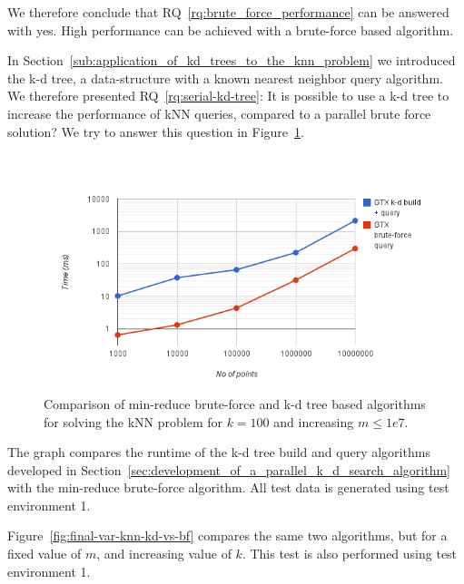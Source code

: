 We therefore conclude that RQ~\ref{rq:brute_force_performance} can be answered with yes. High performance can be achieved with a brute-force based algorithm.

In Section~\ref{sub:application_of_kd_trees_to_the_knn_problem} we introduced the k-d tree, a data-structure with a known  nearest neighbor query algorithm. We therefore presented RQ~\ref{rq:serial-kd-tree}: It is possible to use a k-d tree to increase the performance of kNN queries, compared to a parallel brute force solution? We try to answer this question in Figure~\ref{fig:final-knn-kd-vs-bf}.

\begin{figure}[ht!]
    \centering
    \includegraphics[width=120mm]{../gfx/final-knn-kd-vs-bf.png}
    \caption{Comparison of min-reduce brute-force and k-d tree based algorithms for solving the kNN problem for $k=100$ and increasing $m\le1e7$.}
    \label{fig:final-knn-kd-vs-bf}
\end{figure}

The graph compares the runtime of the k-d tree build and query algorithms developed in Section~\ref{sec:development_of_a_parallel_k_d_search_algorithm} with the min-reduce brute-force algorithm. All test data is generated using test environment 1.

Figure~\ref{fig:final-var-knn-kd-vs-bf} compares the same two algorithms, but for a fixed value of $m$, and increasing value of $k$. This test is also performed using test environment 1.

